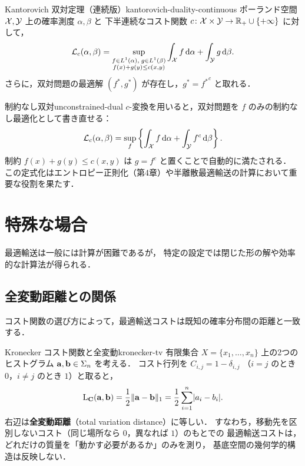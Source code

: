 \begin{theorem}{Kantorovich 双対定理（連続版）}{kantorovich-duality-continuous}
  ポーランド空間 $\mathcal{X}, \mathcal{Y}$ 上の確率測度 $\alpha, \beta$ と
  下半連続なコスト関数 $c \colon \mathcal{X} \times \mathcal{Y} \to \mathbb{R}_+ \cup \{+\infty\}$ に対して，
  \[
    \mathcal{L}_c(\alpha, \beta)
    = \sup_{\substack{f \in L^1(\alpha),\; g \in L^1(\beta) \\ f(x) + g(y) \leq c(x,y)}}
    \int_{\mathcal{X}} f \, \mathrm{d}\alpha + \int_{\mathcal{Y}} g \, \mathrm{d}\beta.
  \]
  さらに，双対問題の最適解 $(f^*, g^*)$ が存在し，$g^* = {f^*}^c$ と取れる．
\end{theorem}

\begin{remark}{制約なし双対}{unconstrained-dual}
  $c$-変換を用いると，双対問題を $f$ のみの制約なし最適化として書き直せる：
  \[
    \mathcal{L}_c(\alpha, \beta)
    = \sup_{f}
    \left\{
    \int_{\mathcal{X}} f \, \mathrm{d}\alpha + \int_{\mathcal{Y}} f^c \, \mathrm{d}\beta
    \right\}.
  \]
  制約 $f(x) + g(y) \leq c(x, y)$ は $g = f^c$ と置くことで自動的に満たされる．
  この定式化はエントロピー正則化（第4章）や半離散最適輸送の計算において重要な役割を果たす．
\end{remark}

\section{特殊な場合}
\label{sec:special-cases}

最適輸送は一般には計算が困難であるが，
特定の設定では閉じた形の解や効率的な計算法が得られる．

\subsection{全変動距離との関係}
\label{subsec:total-variation}

コスト関数の選び方によって，最適輸送コストは既知の確率分布間の距離と一致する．

\begin{remark}{Kronecker コスト関数と全変動}{kronecker-tv}
  有限集合 $X = \{x_1, \ldots, x_n\}$ 上の2つのヒストグラム
  $\mathbf{a}, \mathbf{b} \in \Sigma_n$ を考える．
  コスト行列を $C_{i,j} = 1 - \delta_{i,j}$
  （$i = j$ のとき $0$，$i \neq j$ のとき $1$）と取ると，
  \[
    \mathrm{L}_{\mathbf{C}}(\mathbf{a}, \mathbf{b})
    = \frac{1}{2}\lVert \mathbf{a} - \mathbf{b} \rVert_1
    = \frac{1}{2}\sum_{i=1}^n \lvert a_i - b_i \rvert.
  \]
  右辺は\textbf{全変動距離}（total variation distance）に等しい．
  すなわち，移動先を区別しないコスト（同じ場所なら $0$，異なれば $1$）のもとでの
  最適輸送コストは，どれだけの質量を「動かす必要があるか」のみを測り，
  基底空間の幾何学的構造は反映しない．
\end{remark}

